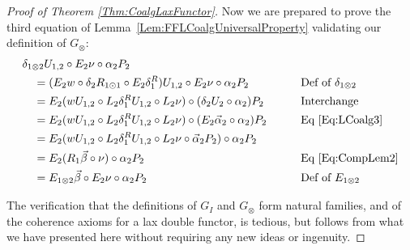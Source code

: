 \begin{proof}[Proof of Theorem \ref{Thm:CoalgLaxFunctor}]
	Now we are prepared to prove the third equation of Lemma~\ref{Lem:FFLCoalgUniversalProperty} validating our definition of $G_{\otimes}$:
	\begin{alignat*}{2}
		\hspace{1em}&\hspace{-1em} \delta_{1\otimes2}U_{1,2} \circ E_2\nu \circ \alpha_2P_2 && \\
		&= (E_2w \circ \delta_2R_{1\odot1} \circ E_2\delta_1^R)U_{1,2} \circ E_2\nu \circ \alpha_2P_2
			&& \text{Def of $\delta_{1\otimes2}$} \\
		&= E_2(wU_{1,2} \circ L_2\delta_1^RU_{1,2} \circ L_2\nu) \circ (\delta_2U_2 \circ \alpha_2)P_2
			&& \text{Interchange} \\
		&= E_2(wU_{1,2} \circ L_2\delta_1^RU_{1,2} \circ L_2\nu) \circ (E_2\vec{\alpha}_2 \circ \alpha_2)P_2
			&\qquad& \text{Eq \eqref{Eq:LCoalg3}} \\
		&= E_2(wU_{1,2} \circ L_2\delta_1^RU_{1,2} \circ L_2\nu \circ \vec{\alpha}_2P_2) \circ \alpha_2P_2 && \\
		&= E_2(R_1\vec{\beta}\circ\nu) \circ \alpha_2P_2
			&& \text{Eq \eqref{Eq:CompLem2}} \\
		&= E_{1\otimes 2}\vec{\beta} \circ E_2\nu \circ \alpha_2P_2
			&& \text{Def of $E_{1\otimes2}$}
	\end{alignat*}

	The verification that the definitions of $G_I$ and $G_{\otimes}$ form natural families, and of the coherence axioms for a lax double functor, is tedious, but follows from what we have presented here without requiring any new ideas or ingenuity.
\end{proof}

